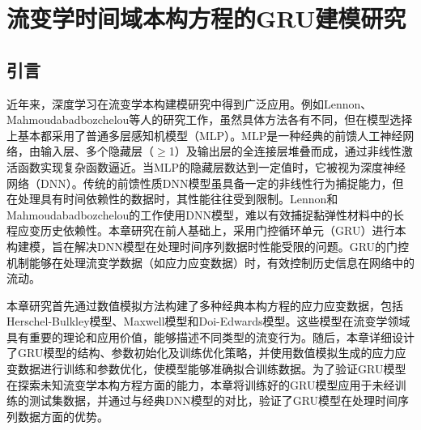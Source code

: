 \chapter{流变学时间域本构方程的GRU建模研究}
\section{引言}
近年来，深度学习在流变学本构建模研究中得到广泛应用。例如Lennon、Mahmoudabadbozchelou等人的研究工作，虽然具体方法各有不同，但在模型选择上基本都采用了普通多层感知机模型（MLP）\cite{lennonScientificMachineLearning2023a,mahmoudabadbozchelouDatadrivenPhysicsinformedConstitutive2021}。MLP是一种经典的前馈人工神经网络，由输入层、多个隐藏层（$\geqslant$1）及输出层的全连接层堆叠而成，通过非线性激活函数实现复杂函数逼近。当MLP的隐藏层数达到一定值时，它被视为深度神经网络（DNN）。传统的前馈性质DNN模型虽具备一定的非线性行为捕捉能力，但在处理具有时间依赖性的数据时，其性能往往受到限制。Lennon和Mahmoudabadbozchelou的工作使用DNN模型，难以有效捕捉黏弹性材料中的长程应变历史依赖性。本章研究在前人基础上，采用门控循环单元（GRU）进行本构建模，旨在解决DNN模型在处理时间序列数据时性能受限的问题。GRU的门控机制能够在处理流变学数据（如应力应变数据）时，有效控制历史信息在网络中的流动。

本章研究首先通过数值模拟方法构建了多种经典本构方程的应力应变数据，包括Herschel-Bulkley模型、Maxwell模型和Doi-Edwards模型。这些模型在流变学领域具有重要的理论和应用价值，能够描述不同类型的流变行为。随后，本章详细设计了GRU模型的结构、参数初始化及训练优化策略，并使用数值模拟生成的应力应变数据进行训练和参数优化，使模型能够准确拟合训练数据。为了验证GRU模型在探索未知流变学本构方程方面的能力，本章将训练好的GRU模型应用于未经训练的测试集数据，并通过与经典DNN模型的对比，验证了GRU模型在处理时间序列数据方面的优势。

